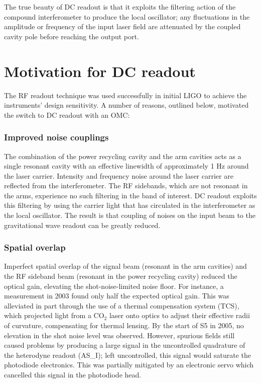 The true beauty of DC readout is that it exploits the filtering
action of the compound interferometer to produce the local oscillator;
any fluctuations in the amplitude or frequency of the input laser
field are attenuated by the coupled cavity pole before reaching the
output port.

\section{Motivation for DC readout}

The RF readout technique was used successfully in initial LIGO to
achieve the instruments' design sensitivity.  A number of reasons,
outlined below, motivated the switch to DC readout with an OMC:

\subsubsection*{Improved noise couplings} 
The combination of the power recycling cavity and the arm cavities
acts as a single resonant cavity with an effective linewidth of
approximately 1 Hz around the laser carrier.  Intensity and frequency
noise around the laser carrier are reflected from the
interferometer.  The RF sidebands, which are not resonant in the arms,
experience no such filtering in the band of interest.  DC readout
exploits this filtering by using the carrier light that has circulated
in the interferometer as the local oscillator.  The result is that
coupling of noises on the input beam to the gravitational wave readout
can be greatly reduced.

\subsubsection*{Spatial overlap}  
Imperfect spatial overlap of the signal beam (resonant in the arm
cavities) and the RF sideband beam (resonant in the power recycling
cavity) reduced the optical gain, elevating the shot-noise-limited
noise floor. For instance, a measurement in 2003 found only half the
expected optical gain\cite{Fritschel2003Shot}.  This was alleviated in
part through the use of a thermal compensation system (TCS), which
projected light from a CO$_2$ laser onto optics to adjust their
effective radii of curvature, compensating for thermal lensing.  By
the start of S5 in 2005, no elevation in the shot noise level was
observed\cite{Ballmer2006LIGO}.  However, spurious fields still caused
problems by producing a large signal in the uncontrolled quadrature of
the heterodyne readout (AS\_I); left uncontrolled, this signal would
saturate the photodiode electronics.  This was partially mitigated by
an electronic servo which cancelled this signal in the photodiode
head.

